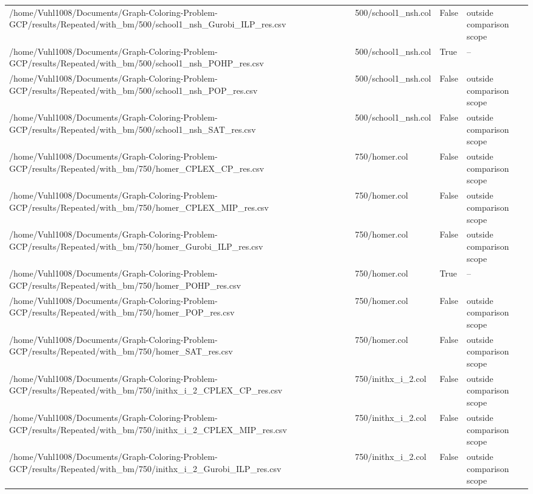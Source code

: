 \begin{table}[htbp]
\begin{tabular}{llll}
/home/Vuhl1008/Documents/Graph-Coloring-Problem-GCP/results/Repeated/with\_bm/500/school1\_nsh\_Gurobi\_ILP\_res.csv & 500/school1\_nsh.col & False & outside comparison scope \\
/home/Vuhl1008/Documents/Graph-Coloring-Problem-GCP/results/Repeated/with\_bm/500/school1\_nsh\_POHP\_res.csv & 500/school1\_nsh.col & True & -- \\
/home/Vuhl1008/Documents/Graph-Coloring-Problem-GCP/results/Repeated/with\_bm/500/school1\_nsh\_POP\_res.csv & 500/school1\_nsh.col & False & outside comparison scope \\
/home/Vuhl1008/Documents/Graph-Coloring-Problem-GCP/results/Repeated/with\_bm/500/school1\_nsh\_SAT\_res.csv & 500/school1\_nsh.col & False & outside comparison scope \\
/home/Vuhl1008/Documents/Graph-Coloring-Problem-GCP/results/Repeated/with\_bm/750/homer\_CPLEX\_CP\_res.csv & 750/homer.col & False & outside comparison scope \\
/home/Vuhl1008/Documents/Graph-Coloring-Problem-GCP/results/Repeated/with\_bm/750/homer\_CPLEX\_MIP\_res.csv & 750/homer.col & False & outside comparison scope \\
/home/Vuhl1008/Documents/Graph-Coloring-Problem-GCP/results/Repeated/with\_bm/750/homer\_Gurobi\_ILP\_res.csv & 750/homer.col & False & outside comparison scope \\
/home/Vuhl1008/Documents/Graph-Coloring-Problem-GCP/results/Repeated/with\_bm/750/homer\_POHP\_res.csv & 750/homer.col & True & -- \\
/home/Vuhl1008/Documents/Graph-Coloring-Problem-GCP/results/Repeated/with\_bm/750/homer\_POP\_res.csv & 750/homer.col & False & outside comparison scope \\
/home/Vuhl1008/Documents/Graph-Coloring-Problem-GCP/results/Repeated/with\_bm/750/homer\_SAT\_res.csv & 750/homer.col & False & outside comparison scope \\
/home/Vuhl1008/Documents/Graph-Coloring-Problem-GCP/results/Repeated/with\_bm/750/inithx\_i\_2\_CPLEX\_CP\_res.csv & 750/inithx\_i\_2.col & False & outside comparison scope \\
/home/Vuhl1008/Documents/Graph-Coloring-Problem-GCP/results/Repeated/with\_bm/750/inithx\_i\_2\_CPLEX\_MIP\_res.csv & 750/inithx\_i\_2.col & False & outside comparison scope \\
/home/Vuhl1008/Documents/Graph-Coloring-Problem-GCP/results/Repeated/with\_bm/750/inithx\_i\_2\_Gurobi\_ILP\_res.csv & 750/inithx\_i\_2.col & False & outside comparison scope \\

\end{tabular}
\end{table}
